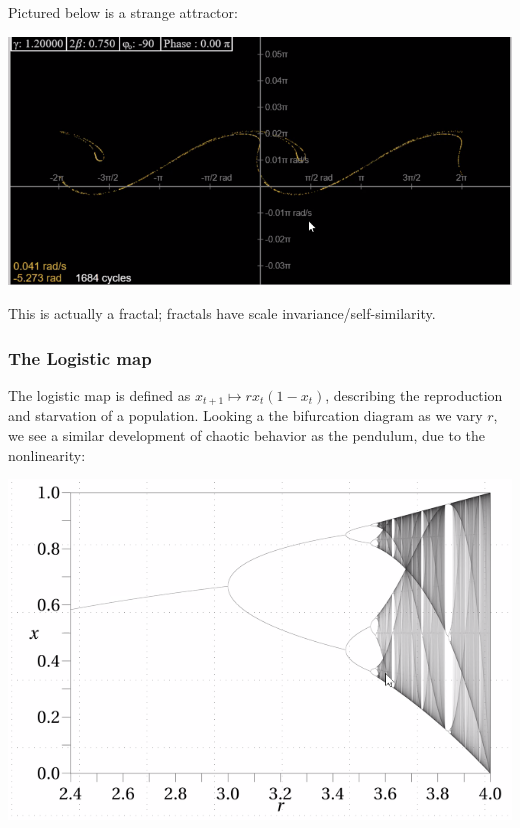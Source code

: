 Pictured below is a strange attractor:
\begin{center}
    \includegraphics[scale=0.7]{Lecture-33/l33-img19.png}
\end{center}
This is actually a fractal; fractals have scale invariance/self-similarity.

\subsubsection{The Logistic map}
The logistic map is defined as $x_{t+1} \mapsto rx_t(1 - x_t)$, describing the reproduction and starvation of a population. Looking a the bifurcation diagram as we vary $r$, we see a similar development of chaotic behavior as the pendulum, due to the nonlinearity:
\begin{center}
    \includegraphics[scale=0.7]{Lecture-33/l33-img20.png}
\end{center}
